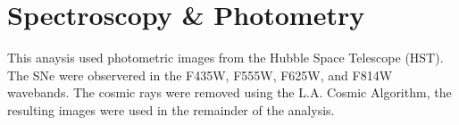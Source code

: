 \documentclass[preprint]{aastex}
\begin{document}




\section{Spectroscopy \& Photometry}

This anaysis used photometric images from the Hubble Space Telescope (HST).
The SNe were observered in the F435W, F555W, F625W, and F814W wavebands. 
The cosmic rays were removed using the L.A. Cosmic Algorithm,
the resulting images were used in the remainder of the analysis. 



\end{document}
